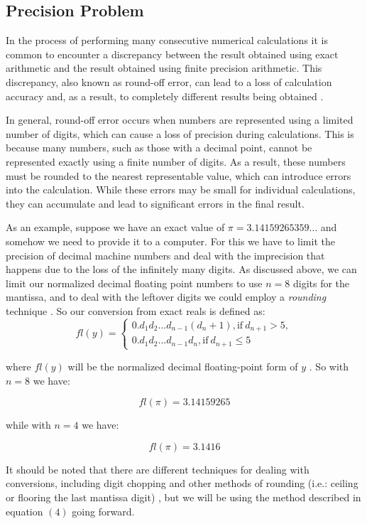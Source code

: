 \documentclass[letterpaper,12pt]{article}
\begin{document}
\subsection{Precision Problem}

In the process of performing many consecutive numerical calculations it is common to encounter a discrepancy between the result obtained using exact arithmetic and the result obtained using finite precision arithmetic. This discrepancy, also known as round-off error, can lead to a loss of calculation accuracy and, as a result, to completely different results being obtained \cite{accuracy}.

In general, round-off error occurs when numbers are represented using a limited number of digits, which can cause a loss of precision during calculations. This is because many numbers, such as those with a decimal point, cannot be represented exactly using a finite number of digits. As a result, these numbers must be rounded to the nearest representable value, which can introduce errors into the calculation. While these errors may be small for individual calculations, they can accumulate and lead to significant errors in the final result.

As an example, suppose we have an exact value of $\pi=3.14159265359\dots$ and somehow we need to provide it to a computer. For this we have to limit the precision of decimal machine numbers and deal with the imprecision that happens due to the loss of the infinitely many digits. As discussed above, we can limit our normalized decimal floating point numbers to use $n=8$ digits for the mantissa, and to deal with the leftover digits we could employ a \textit{rounding} technique \cite{DFPN}. So our conversion from exact reals is defined as:
\begin{equation}
    fl(y) = 
    \begin{cases}
        0.d_1d_2...d_{n-1}(d_{n} + 1), \text{if}\ d_{n+1} > 5,\\
        0.d_1d_2...d_{n-1}d_n, \text{if}\ d_{n+1} \leq 5
    \end{cases}
\end{equation}

where $fl(y)$ will be the normalized decimal floating-point form of $y$ \cite{floatingform}. So with $n=8$ we have:

$$fl(\pi) = 3.14159265$$

while with $n=4$ we have:

$$fl(\pi) = 3.1416$$

It should be noted that there are different techniques for dealing with conversions, including digit chopping and other methods of rounding (i.e.: ceiling or flooring the last mantissa digit) \cite{floatingform}, but we will be using the method described in equation $(4)$ going forward.
\end{document}
